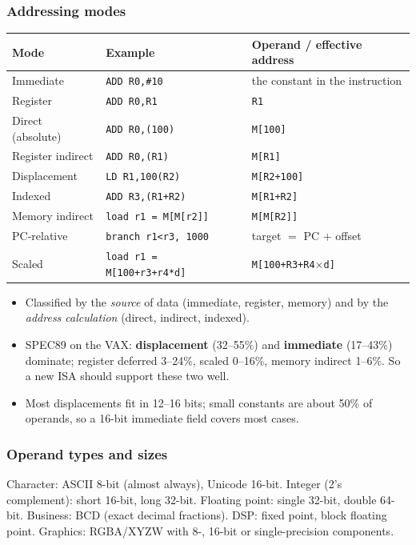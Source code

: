 \subsubsection{Addressing modes}
\begin{center}
\small
\begin{tabular}{@{}lll@{}}
\toprule
Mode & Example & Operand / effective address \\
\midrule
Immediate & \texttt{ADD R0,\#10} & the constant in the instruction \\
Register & \texttt{ADD R0,R1} & \texttt{R1} \\
Direct (absolute) & \texttt{ADD R0,(100)} & \texttt{M[100]} \\
Register indirect & \texttt{ADD R0,(R1)} & \texttt{M[R1]} \\
Displacement & \texttt{LD R1,100(R2)} & \texttt{M[R2+100]} \\
Indexed & \texttt{ADD R3,(R1+R2)} & \texttt{M[R1+R2]} \\
Memory indirect & \texttt{load r1 = M[M[r2]]} & \texttt{M[M[R2]]} \\
PC-relative & \texttt{branch r1<r3, 1000} & target $=$ PC $+$ offset \\
Scaled & \texttt{load r1 = M[100+r3+r4*d]} & \texttt{M[100+R3+R4$\times$d]} \\
\bottomrule
\end{tabular}
\end{center}
\begin{itemize}[leftmargin=*]
  \item Classified by the \emph{source} of data (immediate, register, memory)
  and by the \emph{address calculation} (direct, indirect, indexed).
  \item SPEC89 on the VAX: \textbf{displacement} (32--55\%) and
  \textbf{immediate} (17--43\%) dominate; register deferred 3--24\%, scaled
  0--16\%, memory indirect 1--6\%. So a new ISA should support these two well.
  \item Most displacements fit in 12--16 bits; small constants are about
  50\% of operands, so a 16-bit immediate field covers most cases.
\end{itemize}

\subsubsection{Operand types and sizes}
Character: ASCII 8-bit (almost always), Unicode 16-bit. Integer (2's
complement): short 16-bit, long 32-bit. Floating point: single 32-bit, double
64-bit. Business: BCD (exact decimal fractions). DSP: fixed point, block
floating point. Graphics: RGBA/XYZW with 8-, 16-bit or single-precision
components.


